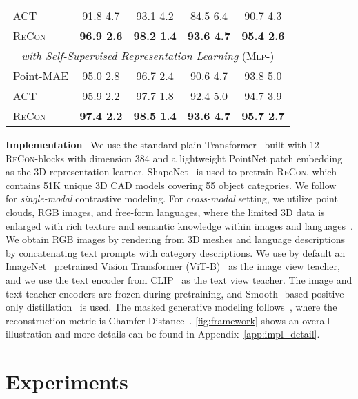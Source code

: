 \documentclass{article}
\theoremstyle{plain}
\theoremstyle{definition}
\theoremstyle{remark}
\def\recon{{\scshape ReCon}}
\newcommand{\reconcolor}[1]{\textcolor{reconcolor}{#1}}
\newcommand{\vitcolor}[1]{\textcolor{vitcolor}{#1}}
\newcommand{\br}{\reconcolor{\,}} \newcommand{\bv}{\vitcolor{\,}}  \newcommand{\bs}{\vitcolor{\,}} \newcommand{\bh}{\reconcolor{\,}}
\begin{document}
\begin{center}
\begin{table}[t!]
{\begin{tabular}{lcccc}
    \bv ACT & 91.8  4.7 & 93.1  4.2 & 84.5  6.4 & 90.7  4.3\\
    \rowcolor{linecolor}\br\recon & \textbf{96.9  2.6} & \textbf{98.2  1.4} & \textbf{93.6  4.7} & \textbf{95.4  2.6}\\
    \midrule[0.6pt]
    \multicolumn{5}{c}{\textit{with Self-Supervised Representation Learning} ({\scshape Mlp-})}\\
    \midrule[0.6pt]
    \br Point-MAE & 95.0  2.8 & 96.7  2.4 & 90.6  4.7 & 93.8  5.0\\
    \bv ACT & 95.9  2.2 & 97.7  1.8 & 92.4  5.0 & 94.7  3.9\\
    \rowcolor{linecolor}\br\recon&\textbf{97.4  2.2 }& \textbf{98.5  1.4} & \textbf{93.6  4.7}& \textbf{95.7  2.7}\\
    \bottomrule[0.95pt]
    \end{tabular}
    }
\vspace{-10pt}
\end{table}
\end{center} 
\vspace{-20pt}
\textbf{Implementation}~
We use the standard plain Transformer~\citep{AttentionIsAllYouNeed} built with 12 \recon-blocks with dimension 384 and a lightweight PointNet patch embedding~\citep{PointNet,PointNet++,PointBERT} as the 3D representation learner.
ShapeNet~\citep{ShapeNet15} is used to pretrain \recon, which contains 51K unique 3D CAD models covering 55 object categories. 
We follow~\citet{SCL20} for \textit{single-modal} contrastive modeling.
For \textit{cross-modal} setting, we utilize point clouds, RGB images, and free-form languages, where the limited 3D data is enlarged with rich texture and semantic knowledge within images and languages~\citep{CrossPoint22,ACT23}.
We obtain RGB images by rendering from 3D meshes and language descriptions by concatenating text prompts with category descriptions. 
We use by default an ImageNet~\citep{ImageNet09} pretrained Vision Transformer (ViT-B)~\citep{ViT} as the image view teacher, and we use the text encoder from CLIP~\citep{CLIP} as the text view teacher.
The image and text teacher encoders are frozen during pretraining, and Smooth -based positive-only distillation~\citep{SimSiam,WhiteContrast21} is used.
The masked generative modeling follows~\citet{PointMAE}, where the reconstruction metric is  Chamfer-Distance~\citep{ChamferDistance17}.
\cref{fig:framework} shows an overall illustration and more details can be found in Appendix~\ref{app:impl_detail}. \vspace{-3pt}
\section{Experiments}
\vspace{-3pt}
\end{document}
